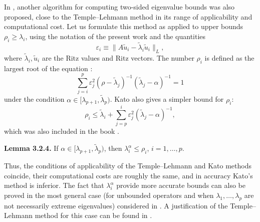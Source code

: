 \documentclass[11pt,oneside]{book}
\begin{document}
In \citep{Kato1949}, another algorithm for computing two-sided eigenvalue bounds was also proposed, close to the Temple--Lehmann method in its range of applicability and computational cost. Let us formulate this method as applied to upper bounds $\rho_i \geqslant \lambda_i$, using the notation of the present work and the quantities
\[
\varepsilon_i \equiv \|A\tilde{u}_i - \tilde{\lambda}_i \tilde{u}_i\|_L,
\]
where $\tilde{\lambda}_i, \tilde{u}_i$ are the Ritz values and Ritz vectors. The number $\rho_i$ is defined as the largest root of the equation \citep{Kato1949}:
\[
\sum_{j=i}^p \varepsilon_j^2 (\rho - \tilde{\lambda}_j)^{-1} (\tilde{\lambda}_j - \alpha)^{-1} = 1
\tag{3.2.9}
\]
under the condition $\alpha \in [\lambda_{p+1}, \tilde{\lambda}_p)$. Kato also gives a simpler bound for $\rho_i$:
\[
\rho_i \leqslant \tilde{\lambda}_i + \sum_{j=p}^i \varepsilon_j^2 (\tilde{\lambda}_j - \alpha)^{-1}, %
\tag{3.2.10}
\]
which was also included in the book \citep{Chatelin1983}.

\textbf{Lemma 3.2.4.} If $\alpha \in [\lambda_{p+1}, \tilde{\lambda}_p)$, then $\lambda_i^\alpha \leqslant \rho_i$, $i = 1, \ldots, p$.

Thus, the conditions of applicability of the Temple--Lehmann and Kato methods coincide, their computational costs are roughly the same, and in accuracy Kato's method is inferior. The fact that $\lambda_i^\alpha$ provide more accurate bounds can also be proved in the most general case (for unbounded operators and when $\lambda_1, \ldots, \lambda_p$ are not necessarily extreme eigenvalues) considered in \citep{Kato1949}. A justification of the Temple--Lehmann method for this case can be found in \citep{GoerischAlbrecht1984a}.
\end{document}
